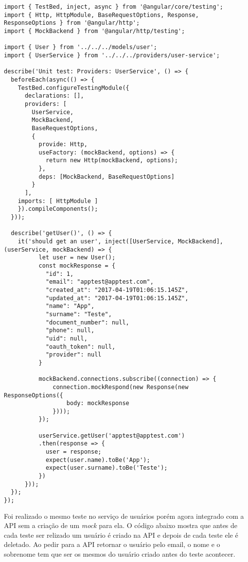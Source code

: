 \medskip
\begin{lstlisting}[caption=Exemplo de teste unitário do serviço de usuários]
import { TestBed, inject, async } from '@angular/core/testing';
import { Http, HttpModule, BaseRequestOptions, Response, ResponseOptions } from '@angular/http';
import { MockBackend } from '@angular/http/testing';

import { User } from '../../../models/user';
import { UserService } from '../../../providers/user-service';

describe('Unit test: Providers: UserService', () => {
  beforeEach(async(() => {
    TestBed.configureTestingModule({
      declarations: [],
      providers: [
        UserService,
        MockBackend,
        BaseRequestOptions,
        {
          provide: Http,
          useFactory: (mockBackend, options) => {
            return new Http(mockBackend, options);
          },
          deps: [MockBackend, BaseRequestOptions]
        }
      ],
    imports: [ HttpModule ]
    }).compileComponents();
  }));

  describe('getUser()', () => {
    it('should get an user', inject([UserService, MockBackend], (userService, mockBackend) => {
          let user = new User();
          const mockResponse = {
            "id": 1,
            "email": "apptest@apptest.com",
            "created_at": "2017-04-19T01:06:15.145Z",
            "updated_at": "2017-04-19T01:06:15.145Z",
            "name": "App",
            "surname": "Teste",
            "document_number": null,
            "phone": null,
            "uid": null,
            "oauth_token": null,
            "provider": null
          }

          mockBackend.connections.subscribe((connection) => {
              connection.mockRespond(new Response(new ResponseOptions({
                  body: mockResponse
              })));
          });

          userService.getUser('apptest@apptest.com')
          .then(response => {
            user = response;
            expect(user.name).toBe('App');
            expect(user.surname).toBe('Teste');
          })
      }));
  });
});
\end{lstlisting}

Foi realizado o mesmo teste no serviço de usuários porém agora integrado com a API sem a criação de um \textit{mock} para ela.
O código abaixo mostra que antes de cada teste ser relizado um usuário é criado na API e depois de cada teste ele é deletado.
Ao pedir para a API retornar o usuário pelo email, o nome e o sobrenome tem que ser os mesmos do usuário criado antes do teste acontecer.


